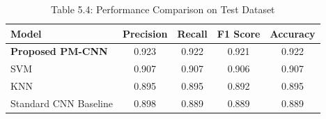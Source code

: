 \begin{table}[htbp]
\centering
\caption{Table 5.4: Performance Comparison on Test Dataset}
\label{tab:test_perf}
\begin{tabular}{lcccc}
\toprule
\textbf{Model} & \textbf{Precision} & \textbf{Recall} & \textbf{F1 Score} & \textbf{Accuracy} \\
\midrule
\textbf{Proposed PM-CNN}       &   0.923    &   0.922    &   0.921    &   0.922    \\
SVM                            &   0.907    &   0.907    &   0.906    &   0.907    \\
KNN                            &   0.895    &   0.895    &   0.892    &   0.895    \\
Standard CNN Baseline          &   0.898    &   0.889    &   0.889    &   0.889    \\
\bottomrule
\end{tabular}
\end{table}
